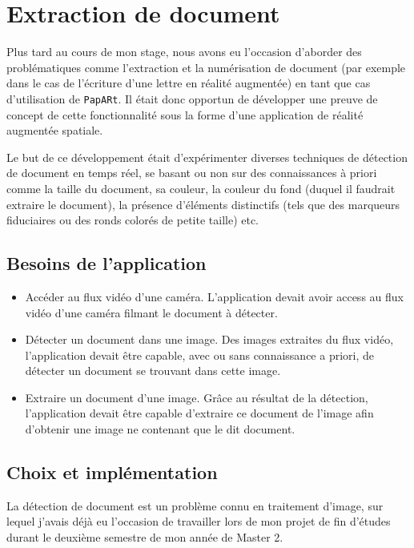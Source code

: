 \newpage
\section{Extraction de document}
\label{sec:document}
Plus tard au cours de mon stage, nous avons eu l'occasion d'aborder des problématiques comme l'extraction et la numérisation de document (par exemple dans le cas de l'écriture d'une lettre en réalité augmentée) en tant que cas d'utilisation de \texttt{PapARt}. Il était donc opportun de développer une preuve de concept de cette fonctionnalité sous la forme d'une application de réalité augmentée spatiale.

Le but de ce développement était d'expérimenter diverses techniques de détection de document en temps réel, se basant ou non sur des connaissances à priori comme la taille du document, sa couleur, la couleur du fond (duquel il faudrait extraire le document), la présence d'éléments distinctifs (tels que des marqueurs fiduciaires ou des ronds colorés de petite taille) etc.

\subsection{Besoins de l'application}
\label{subsec:doc:content}
\begin{itemize}
\item Accéder au flux vidéo d'une caméra. L'application devait avoir access au flux vidéo d'une caméra filmant le document à détecter.
\item Détecter un document dans une image. Des images extraites du flux vidéo, l'application devait être capable, avec ou sans connaissance a priori, de détecter un document se trouvant dans cette image.
\item Extraire un document d'une image. Grâce au résultat de la détection, l'application devait être capable d'extraire ce document de l'image afin d'obtenir une image ne contenant que le dit document.
\end{itemize}

\subsection{Choix et implémentation}
\label{subsec:doc:impl}

La détection de document est un problème connu en traitement d'image, sur lequel j'avais déjà eu l'occasion de travailler lors de mon projet de fin d'études durant le deuxième semestre de mon année de Master 2.

